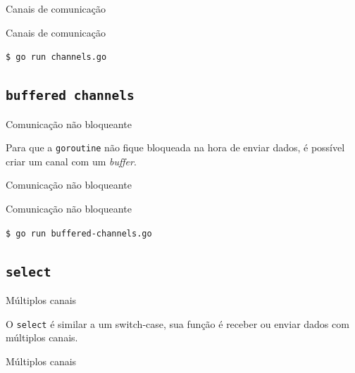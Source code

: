 \documentclass{beamer}
\begin{document}
\begin{frame}[fragile]
    {Canais de comunicação}

    
\end{frame}

\begin{frame}[fragile]
    {Canais de comunicação}

    \verb|$ go run channels.go|
    
\end{frame}


\subsection{\tt buffered channels}
\begin{frame}
    {Comunicação não bloqueante}

    Para que a {\tt goroutine} não fique bloqueada na hora de enviar dados, é
    possível criar um canal com um {\em buffer}.
\end{frame}

\begin{frame}[fragile]
    {Comunicação não bloqueante}

    
\end{frame}

\begin{frame}[fragile]
    {Comunicação não bloqueante}

    \verb|$ go run buffered-channels.go|
    
\end{frame}

\subsection{\tt select}
\begin{frame}
    {Múltiplos canais}

    O {\tt select} é similar a um switch-case, sua função é receber ou enviar
    dados com múltiplos canais.
\end{frame}

\begin{frame}[fragile]
    {Múltiplos canais}

    
\end{frame}
\end{document}
